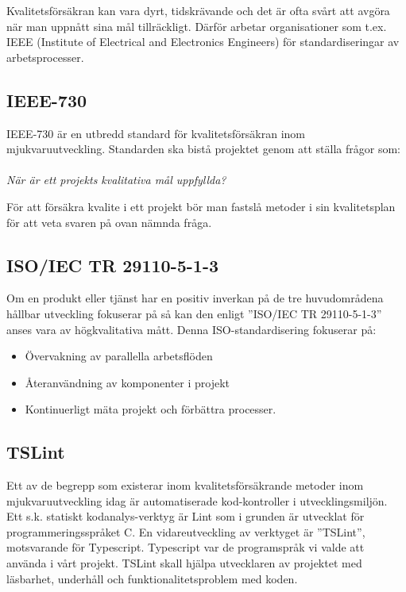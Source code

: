 Kvalitetsförsäkran kan vara dyrt, tidskrävande och det är ofta svårt att avgöra när man uppnått sina mål tillräckligt\cite{lighthouse}.
Därför arbetar organisationer som t.ex. IEEE (Institute of Electrical and Electronics Engineers) för standardiseringar av arbetsprocesser.



\subsection{IEEE-730}

IEEE-730 är en utbredd standard för kvalitetsförsäkran inom mjukvaruutveckling. Standarden ska bistå projektet genom att ställa frågor som:
\\ \\
\emph{När är ett projekts kvalitativa mål uppfyllda?}

För att försäkra kvalite i ett projekt bör man fastslå metoder i sin kvalitetsplan för att veta svaren på ovan nämnda fråga. \\


\subsection{ISO/IEC TR 29110-5-1-3}
Om en produkt eller tjänst har en positiv inverkan på de tre huvudområdena hållbar utveckling fokuserar på så kan den enligt ”ISO/IEC TR 29110-5-1-3” \cite{ISOtor} anses vara av högkvalitativa mått. Denna ISO-standardisering fokuserar på: 

\begin{itemize}
	\item Övervakning av parallella arbetsflöden
	\item Återanvändning av komponenter i projekt
	\item Kontinuerligt mäta projekt och förbättra processer.
\end{itemize}


\subsection{TSLint}
Ett av de begrepp som existerar inom kvalitetsförsäkrande metoder inom mjukvaruutveckling idag är automatiserade kod-kontroller i utvecklingsmiljön.
Ett s.k. statiskt kodanalys-verktyg är Lint som i grunden är utvecklat för programmeringsspråket C. En vidareutveckling av verktyget är ”TSLint”, motsvarande för Typescript. Typescript var de programspråk vi valde att använda i vårt projekt. TSLint skall hjälpa utvecklaren av projektet med läsbarhet, underhåll och funktionalitetsproblem med koden.


